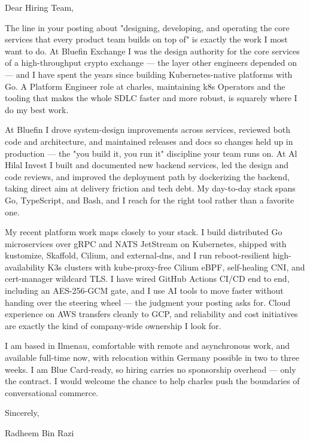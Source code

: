 \documentclass[11pt,a4paper]{coverletter}
\begin{document}

\opening{Dear Hiring Team,}

The line in your posting about "designing, developing, and operating the core services that every product team builds on top of" is exactly the work I most want to do. At Bluefin Exchange I was the design authority for the core services of a high-throughput crypto exchange — the layer other engineers depended on — and I have spent the years since building Kubernetes-native platforms with Go. A Platform Engineer role at charles, maintaining k8s Operators and the tooling that makes the whole SDLC faster and more robust, is squarely where I do my best work.

At Bluefin I drove system-design improvements across services, reviewed both code and architecture, and maintained releases and docs so changes held up in production — the "you build it, you run it" discipline your team runs on. At Al Hilal Invest I built and documented new backend services, led the design and code reviews, and improved the deployment path by dockerizing the backend, taking direct aim at delivery friction and tech debt. My day-to-day stack spans Go, TypeScript, and Bash, and I reach for the right tool rather than a favorite one.

My recent platform work maps closely to your stack. I build distributed Go microservices over gRPC and NATS JetStream on Kubernetes, shipped with kustomize, Skaffold, Cilium, and external-dns, and I run reboot-resilient high-availability K3s clusters with kube-proxy-free Cilium eBPF, self-healing CNI, and cert-manager wildcard TLS. I have wired GitHub Actions CI/CD end to end, including an AES-256-GCM gate, and I use AI tools to move faster without handing over the steering wheel — the judgment your posting asks for. Cloud experience on AWS transfers cleanly to GCP, and reliability and cost initiatives are exactly the kind of company-wide ownership I look for.

I am based in Ilmenau, comfortable with remote and asynchronous work, and available full-time now, with relocation within Germany possible in two to three weeks. I am Blue Card-ready, so hiring carries no sponsorship overhead — only the contract. I would welcome the chance to help charles push the boundaries of conversational commerce.

\closing{Sincerely,}{Radheem Bin Razi}

\clearpage
{}
\end{document}
